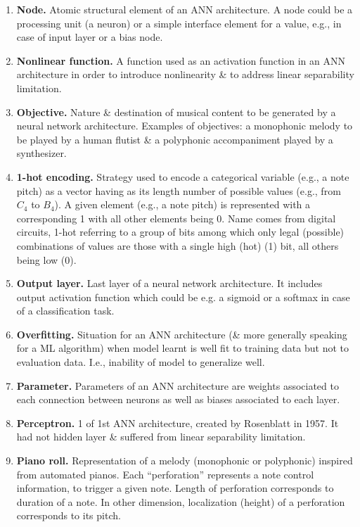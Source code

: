 \documentclass{article}
\begin{document}
\begin{itemize}
\begin{enumerate}
		\item {\bf Node.} Atomic structural element of an ANN architecture. A node could be a processing unit (a neuron) or a simple interface element for a value, e.g., in case of input layer or a bias node.
		\item {\bf Nonlinear function.} A function used as an activation function in an ANN architecture in order to introduce nonlinearity \& to address linear separability limitation.
		\item {\bf Objective.} Nature \& destination of musical content to be generated by a neural network architecture. Examples of objectives: a monophonic melody to be played by a human flutist \& a polyphonic accompaniment played by a synthesizer.
		\item {\bf1-hot encoding.} Strategy used to encode a categorical variable (e.g., a note pitch) as a vector having as its length number of possible values (e.g., from $C_4$ to $B_4$). A given element (e.g., a note pitch) is represented with a corresponding 1 with all other elements being 0. Name comes from digital circuits, 1-hot referring to a group of bits among which only legal (possible) combinations of values are those with a single high (hot) (1) bit, all others being low (0).
		\item {\bf Output layer.} Last layer of a neural network architecture. It includes output activation function which could be e.g. a sigmoid or a softmax in case of a classification task.
		\item {\bf Overfitting.} Situation for an ANN architecture (\& more generally speaking for a ML algorithm) when model learnt is well fit to training data but not to evaluation data. I.e., inability of model to generalize well.
		\item {\bf Parameter.} Parameters of an ANN architecture are weights associated to each connection between neurons as well as biases associated to each layer.
		\item {\bf Perceptron.} 1 of 1st ANN architecture, created by {\sc Rosenblatt} in 1957. It had not hidden layer \& suffered from linear separability limitation.
		\item {\bf Piano roll.} Representation of a melody (monophonic or polyphonic) inspired from automated pianos. Each ``perforation'' represents a note control information, to trigger a given note. Length of perforation corresponds to duration of a note. In other dimension, localization (height) of a perforation corresponds to its pitch.


\end{enumerate}
\end{itemize}
\end{document}
